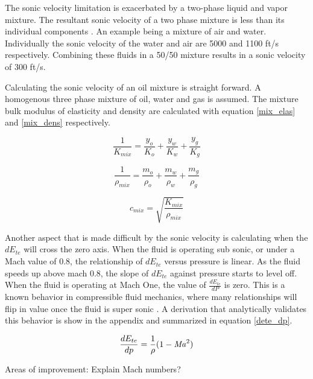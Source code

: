 \documentclass{article}
\newcommand\Mach{\mbox{\textit{Ma}}}  %
\begin{document}
The sonic velocity limitation is exacerbated by a two-phase liquid and vapor mixture. The resultant sonic velocity of a two phase mixture is less than its individual components \cite{himr}. An example being a mixture of air and water. Individually the sonic velocity of the water and air are 5000 and 1100 ft/s respectively. Combining these fluids in a 50/50 mixture results in a sonic velocity of 300 ft/s.

Calculating the sonic velocity of an oil mixture is straight forward. A homogenous three phase mixture of oil, water and gas is assumed. The mixture bulk modulus of elasticity and density are calculated with equation \eqref{mix_elas} and \eqref{mix_dens} respectively.

\begin{equation}
\frac{1}{K_{mix}} = \frac{y_{o}}{K_{o}} + \frac{y_{w}}{K_{w}} + \frac{y_{g}}{K_{g}}
\label{mix_elas}
\end{equation}

\begin{equation}
\frac{1}{\rho_{mix}} = \frac{m_{o}}{\rho_{o}} + \frac{m_{w}}{\rho_{w}} + \frac{m_{g}}{\rho_{g}}
\label{mix_dens}
\end{equation}

\begin{equation}
c_{mix} = \sqrt{\frac{K_{mix}}{\rho_{mix}}}
\label{speed_sound}
\end{equation}

Another aspect that is made difficult by the sonic velocity is calculating when the $dE_{te}$ will cross the zero axis. When the fluid is operating sub sonic, or under a Mach value of 0.8, the relationship of $dE_{te}$ versus pressure is linear. As the fluid speeds up above mach 0.8, the slope of $dE_{te}$ against pressure starts to level off. When the fluid is operating at Mach One, the value of $\frac{dE_{te}}{dP}$ is zero. This is a known behavior in compressible fluid mechanics, where many relationships will flip in value once the fluid is super sonic \cite{fluids_white}. A derivation that analytically validates this behavior is show in the appendix and summarized in equation \eqref{dete_dp}. 

\begin{equation}
\frac{dE_{te}}{dp} = \frac{1}{\rho}(1 - \Mach^2)
\label{dete_dp}
\end{equation}

Areas of improvement:
Explain Mach numbers?

\printbibliography
\end{document}
